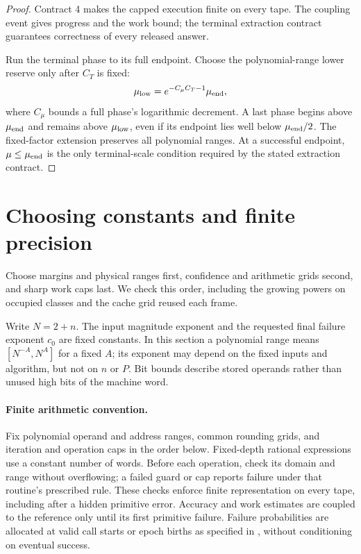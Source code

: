 \documentclass[11pt]{article}
\theoremstyle{remark}
\begin{document}
\begin{proof}
Contract 4 makes the capped execution finite on every tape.
The coupling event gives progress and the work bound; the terminal extraction
contract guarantees correctness of every released answer.

Run the terminal phase to its full endpoint.
Choose the polynomial-range lower reserve only after $C_T$ is fixed:
\[
 \mu_{\rm low}=e^{-C_\mu C_T-1}\mu_{\rm end},
\]
where $C_\mu$ bounds a full phase's logarithmic decrement.
A last phase begins above $\mu_{\rm end}$ and remains above $\mu_{\rm low}$,
even if its endpoint lies well below $\mu_{\rm end}/2$.
The fixed-factor extension preserves all polynomial ranges.
At a successful endpoint, $\mu\le\mu_{\rm end}$ is the only terminal-scale
condition required by the stated extraction contract.
\end{proof}

\section{Choosing constants and finite precision}
\label{sec:ram27-parameter-hierarchy}

Choose margins and physical ranges first, confidence and arithmetic grids
second, and sharp work caps last.
We check this order, including the growing powers on occupied classes and the
cache grid reused each frame.

Write $N=2+n$.
The input magnitude exponent and the requested final failure exponent $c_0$ are
fixed constants.
In this section a polynomial range means $[N^{-A},N^A]$ for a fixed $A$; its
exponent may depend on the fixed inputs and algorithm, but not on $n$ or $P$.
Bit bounds describe stored operands rather than unused high bits of the machine
word.

\paragraph{Finite arithmetic convention.}\label{par:ram30-finite-arithmetic}
Fix polynomial operand and address ranges, common rounding grids, and iteration
and operation caps in the order below.
Fixed-depth rational expressions use a constant number of words.
Before each operation, check its domain and range without overflowing; a failed
guard or cap reports failure under that routine's prescribed rule.
These checks enforce finite representation on every tape, including after a
hidden primitive error.
Accuracy and work estimates are coupled to the reference only until its first
primitive failure.
Failure probabilities are allocated at valid call starts or epoch births as
specified in , without conditioning on eventual success.
\end{document}
